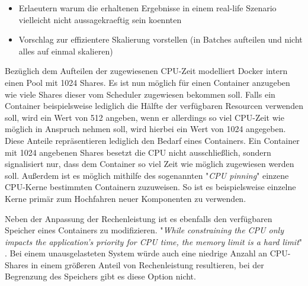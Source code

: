 \begin{itemize}
  \item Erlaeutern warum die erhaltenen Ergebnisse in einem real-life Szenario vielleicht nicht aussagekraeftig sein koennten
  \item Vorschlag zur effizientere Skalierung vorstellen (in Batches aufteilen und nicht alles auf einmal skalieren)
\end{itemize}



Bezüglich dem Aufteilen der zugewiesenen CPU-Zeit modelliert Docker intern einen Pool mit 1024 Shares. Es ist nun möglich für einen Container anzugeben wie viele Shares dieser vom Scheduler zugewiesen bekommen soll. Falls ein Container beispielsweise lediglich die Hälfte der verfügbaren Resourcen verwenden soll, wird ein Wert von 512 angeben, wenn er allerdings so viel CPU-Zeit wie möglich in Anspruch nehmen soll, wird hierbei ein Wert von 1024 angegeben. Diese Anteile repräsentieren lediglich den Bedarf eines Containers. Ein Container mit 1024 angebenen Shares besetzt die CPU nicht ausschließlich, sondern signalisiert nur, dass dem Container so viel Zeit wie möglich zugewiesen werden soll. Außerdem ist es möglich mithilfe des sogenannten "\emph{CPU pinning}" einzene CPU-Kerne bestimmten Containern zuzuweisen. So ist es beispielsweise einzelne Kerne primär zum Hochfahren neuer Komponenten zu verwenden. 

Neben der Anpassung der Rechenleistung ist es ebenfalls den verfügbaren Speicher eines Containers zu modifizieren. "\emph{While constraining the CPU only impacts the application’s priority for CPU time, the memory limit is a hard limit}" \cite[Seite~68 ff.]{oreilly-docker}. Bei einem unausgelasteten System würde auch eine niedrige Anzahl an CPU-Shares in einem größeren Anteil von Rechenleistung resultieren, bei der Begrenzung des Speichers gibt es diese Option nicht. 

